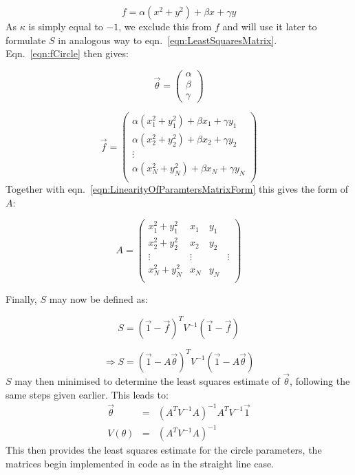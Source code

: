 \begin{equation}
  \label{eqn:fCircle}
  f = \alpha(x^2+y^2) + \beta x + \gamma y
\end{equation}
As $\kappa$ is simply equal to $-1$, we exclude this from $f$ and will use it later to formulate $S$ in analogous way to eqn.~\ref{eqn:LeastSquaresMatrix}. Eqn.~\ref{eqn:fCircle} then gives:

\begin{equation}
  \vec{\theta} =
  \begin{pmatrix}
    \alpha \\
    \beta \\
    \gamma
  \end{pmatrix}
\end{equation}

\begin{equation}
  \vec{f} = 
  \begin{pmatrix}
    \alpha(x_1 ^2+y_1 ^2) + \beta x_1 + \gamma y_1 \\
    \alpha(x_2 ^2+y_2 ^2) + \beta x_2 + \gamma y_2 \\
    \vdots \\
    \alpha(x_N ^2+y_N ^2) + \beta x_N + \gamma y_N \\
  \end{pmatrix}
\end{equation}
Together with eqn.~\ref{eqn:LinearityOfParamtersMatrixForm} this gives the form of $A$:

\begin{equation}
  A = 
    \begin{pmatrix}
      x_1 ^2 + y_1 ^2 & x_1 & y_1 \\
      x_2 ^2 + y_2 ^2 & x_2 & y_2 \\
      \vdots & \vdots &  & \vdots \\
      x_N ^2 + y_N ^2 & x_N & y_N \\
    \end{pmatrix}
\end{equation}

Finally, $S$ may now be defined as:

\begin{equation}
  S = \left(\vec{1} - \vec{f} \right)^T V^{-1} \left(\vec{1} - \vec{f} \right)
\end{equation}

\begin{equation}
  \label{eqn:LeastSquaresCircleMatrix}
  \Rightarrow S = \left(\vec{1} - A\vec{\theta} \right)^T V^{-1} \left(\vec{1} - A\vec{\theta} \right)
\end{equation}
$S$ may then minimised to determine the least squares estimate of $\vec{\theta}$, following the same steps given earlier.  This leads to:
\begin{eqnarray}
  \vec{\theta} & = & \left( A^T V^{-1} A \right)^{-1} A^T V^{-1} \vec{1} \\
  V\left(\theta \right) & = & \left( A^T V^{-1} A \right)^{-1}
\end{eqnarray}
This then provides the least squares estimate for the circle parameters, the matrices begin implemented in code as in the straight line case.
  